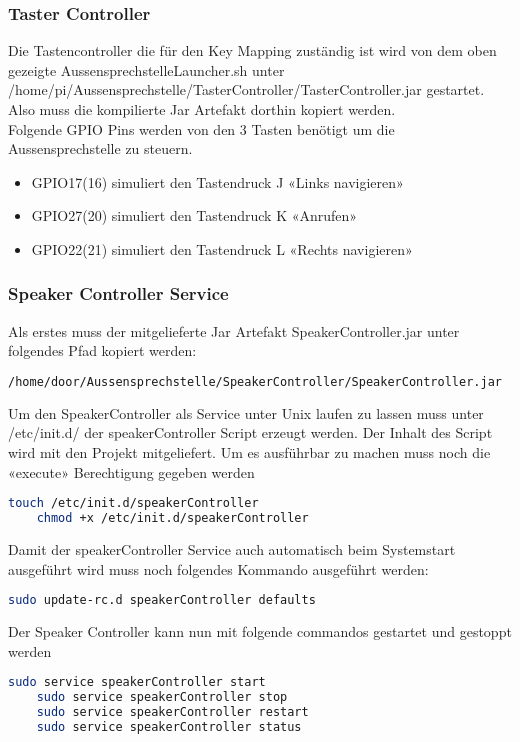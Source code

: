 \subsubsection{Taster Controller}
Die Tastencontroller die für den Key Mapping zuständig ist wird von dem oben gezeigte AussensprechstelleLauncher.sh unter /home/pi/Aussensprechstelle/TasterController/TasterController.jar gestartet. Also muss die kompilierte Jar Artefakt dorthin kopiert werden. \\
Folgende GPIO Pins werden von den 3 Tasten benötigt um die Aussensprechstelle zu steuern.
\begin{itemize}
	\item GPIO17(16) simuliert den Tastendruck J «Links navigieren»
	\item GPIO27(20) simuliert den Tastendruck K «Anrufen»
	\item GPIO22(21) simuliert den Tastendruck L «Rechts navigieren»
\end{itemize}

\subsubsection{Speaker Controller Service}
Als erstes muss der mitgelieferte Jar Artefakt SpeakerController.jar unter folgendes Pfad kopiert werden:
\begin{lstlisting}[backgroundcolor = \color{snippetcolor},
language = bash,
xleftmargin = 1cm,
framexleftmargin = 0.1em,
breaklines=true]
	/home/door/Aussensprechstelle/SpeakerController/SpeakerController.jar
\end{lstlisting}
Um den SpeakerController als Service unter Unix laufen zu lassen muss unter /etc/init.d/ der speakerController Script erzeugt werden. Der Inhalt des Script wird mit den Projekt mitgeliefert.
Um es ausführbar zu machen muss noch die «execute» Berechtigung gegeben werden
\begin{lstlisting}[backgroundcolor = \color{snippetcolor},
language = bash,
xleftmargin = 1cm,
framexleftmargin = 0.1em,
breaklines=true]
	touch /etc/init.d/speakerController
	chmod +x /etc/init.d/speakerController
\end{lstlisting}
Damit der speakerController Service auch automatisch beim Systemstart  ausgeführt wird muss noch folgendes Kommando ausgeführt werden:
\begin{lstlisting}[backgroundcolor = \color{snippetcolor},
language = bash,
xleftmargin = 1cm,
framexleftmargin = 0.1em,
breaklines=true]
	sudo update-rc.d speakerController defaults
\end{lstlisting}
Der Speaker Controller kann nun mit folgende commandos gestartet und gestoppt werden
\begin{lstlisting}[backgroundcolor = \color{snippetcolor},
language = bash,
xleftmargin = 1cm,
framexleftmargin = 0.1em,
breaklines=true]
	sudo service speakerController start
	sudo service speakerController stop
	sudo service speakerController restart
	sudo service speakerController status
\end{lstlisting}


